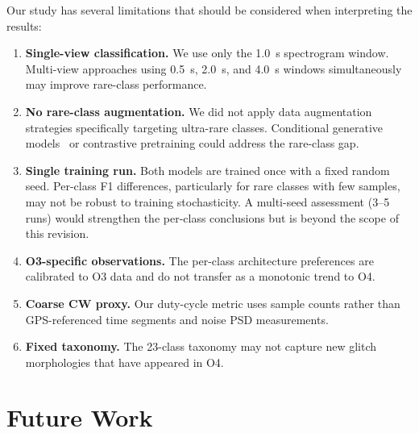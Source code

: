 \documentclass[12pt]{article}
\newcommand{\Nclasses}{23}
\begin{document}
Our study has several limitations that should be considered when interpreting
the results:
\begin{enumerate}
  \item \textbf{Single-view classification.} We use only the 1.0~s
    spectrogram window.
    Multi-view approaches using 0.5~s, 2.0~s, and 4.0~s windows
    simultaneously~\citep{Wu2024} may improve rare-class performance.
  \item \textbf{No rare-class augmentation.} We did not apply
    data augmentation strategies specifically targeting ultra-rare classes.
    Conditional generative models~\citep{Lopez2024} or contrastive
    pretraining could address the rare-class gap.
  \item \textbf{Single training run.} Both models are trained once with a
    fixed random seed.
    Per-class F1 differences, particularly for rare classes with few samples,
    may not be robust to training stochasticity.
    A multi-seed assessment (3--5 runs) would strengthen the per-class
    conclusions but is beyond the scope of this revision.
  \item \textbf{O3-specific observations.} The per-class architecture
    preferences are calibrated to O3 data and do not transfer as a monotonic
    trend to O4.
  \item \textbf{Coarse CW proxy.} Our duty-cycle metric uses sample counts
    rather than GPS-referenced time segments and noise PSD measurements.
  \item \textbf{Fixed taxonomy.} The \Nclasses-class taxonomy may not
    capture new glitch morphologies that have appeared in O4.
\end{enumerate}


\section{Future Work}
\label{sec:future}
\end{document}
